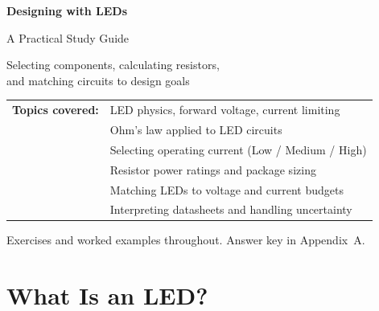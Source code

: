 \documentclass[11pt,letterpaper]{article}
\begin{document}
\begin{titlepage}
  \centering
  \vspace*{1.5cm}
  {\Huge\bfseries\color{navyblue} Designing with LEDs\par}
  \vspace{0.4cm}
  {\Large A Practical Study Guide\par}
  \vspace{0.3cm}
  {\large\color{gray} Selecting components, calculating resistors,\\
   and matching circuits to design goals\par}
  \vspace{2.5cm}


  \vspace{2cm}
  {\normalsize
    \begin{tabular}{rl}
      \textbf{Topics covered:} & LED physics, forward voltage, current limiting \\
      & Ohm's law applied to LED circuits \\
      & Selecting operating current (Low / Medium / High) \\
      & Resistor power ratings and package sizing \\
      & Matching LEDs to voltage and current budgets \\
      & Interpreting datasheets and handling uncertainty \\
    \end{tabular}
  }
  \vfill
  {\small\color{gray} Exercises and worked examples throughout.
  Answer key in Appendix~A.}
\end{titlepage}

\tableofcontents
\newpage

\section{What Is an LED?}
\end{document}
